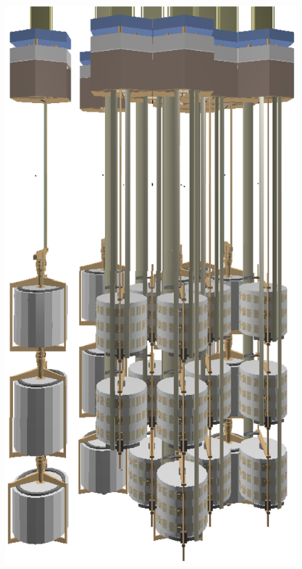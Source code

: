 \begin{figure}[tbhp]
{\includegraphics[height=0.23\textheight]{array}}%
\subfloat[]{\label{fig:atop}
}
\end{figure}
